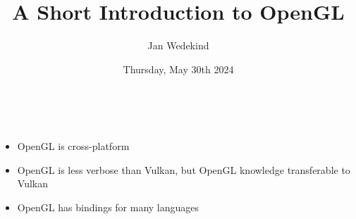 \documentclass[calcdimensions,landscape,letterpaper]{powersem}
\title{A Short Introduction to OpenGL}
\author{Jan Wedekind}
\date{Thursday, May 30th 2024}
\newcommand{\thecurrentheading}{}
\newcommand{\heading}[1]{\renewcommand{\thecurrentheading}{#1}}
\begin{document}
\begin{slide}
  \heading{\ }
  \begin{center}
    \maketitle
  \end{center}
\end{slide}

\begin{slide}
  \heading{Motivation}
  \begin{center}
    \bigskip\\
    \begin{minipage}[c]{.95\textwidth}
      \begin{itemize}
          \item OpenGL is cross-platform
          \item OpenGL is less verbose than Vulkan, but OpenGL knowledge transferable to Vulkan
          \item OpenGL has bindings for many languages
      \end{itemize}
    \end{minipage}
  \end{center}
\end{slide}
\end{document}
